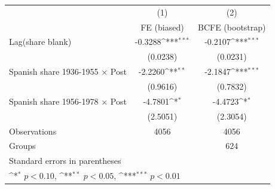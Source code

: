 {
\def\sym#1{\ifmmode^{#1}\else\(^{#1}\)\fi}
\begin{tabular}{l*{2}{c}}
\toprule
            &\multicolumn{1}{c}{(1)}&\multicolumn{1}{c}{(2)}\\
            &\multicolumn{1}{c}{FE (biased)}&\multicolumn{1}{c}{BCFE (bootstrap)}\\
\midrule
Lag(share blank)&     -0.3288\sym{***}&     -0.2107\sym{***}\\
            &    (0.0238)         &    (0.0231)         \\
Spanish share 1936-1955 × Post&     -2.2260\sym{**} &     -2.1847\sym{***}\\
            &    (0.9616)         &    (0.7832)         \\
Spanish share 1956-1978 × Post&     -4.7801\sym{*}  &     -4.4723\sym{*}  \\
            &    (2.5051)         &    (2.3054)         \\
\midrule
Observations&        4056         &        4056         \\
Groups      &                     &         624         \\
\bottomrule
\multicolumn{3}{l}{\footnotesize Standard errors in parentheses}\\
\multicolumn{3}{l}{\footnotesize \sym{*} \(p<0.10\), \sym{**} \(p<0.05\), \sym{***} \(p<0.01\)}\\
\end{tabular}
}

